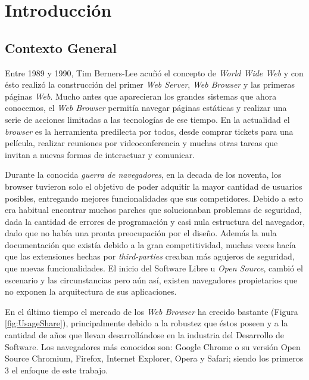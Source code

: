 


\chapter{Introducción}
\label{chap1:intro}

\section{Contexto General}
\label{chap1:CG}

Entre 1989 y 1990, Tim Berners-Lee acuñó el concepto de \textit{World Wide Web} y con ésto realizó la construcción del primer \textit{Web Server}, \textit{Web Browser} y las primeras páginas \textit{Web}. Mucho antes que aparecieran los grandes sistemas que ahora conocemos, el \textit{Web Browser} permitía navegar páginas estáticas y realizar una serie de acciones limitadas a las tecnologías de ese tiempo. En la actualidad el \textit{browser} es la herramienta predilecta por todos, desde comprar tickets para una película, realizar reuniones por videoconferencia y muchas otras tareas que invitan a nuevas formas de interactuar y comunicar.

Durante la conocida \textit{guerra de navegadores}, en la decada de los noventa, los browser tuvieron solo el objetivo de poder adquitir la mayor cantidad de usuarios posibles, entregando mejores funcionalidades que sus competidores. Debido a esto era habitual encontrar muchos parches que solucionaban problemas de seguridad, dada la cantidad de errores de programación y casi nula estructura del navegador, dado que no había una pronta preocupación por el diseño. Además la nula documentación que existía debido a la gran competitividad, muchas veces hacía que las extensiones hechas por \textit{third-parties} creaban más agujeros de seguridad, que nuevas funcionalidades. El inicio del Software Libre u \textit{Open Source}, cambió el escenario y las circunstancias pero aún así, existen navegadores propietarios que no exponen la arquitectura de sus aplicaciones.

En el último tiempo el mercado de los \textit{Web Browser} ha crecido bastante (Figura \ref{fig:UsageShare}), principalmente debido a la robustez que éstos poseen y a la cantidad de años que llevan desarrollándose en la industria del Desarrollo de Software. Los navegadores más conocidos son: Google Chrome o su versión Open Source Chromium, Firefox, Internet Explorer, Opera y Safari; siendo los primeros 3 el enfoque de este trabajo.

